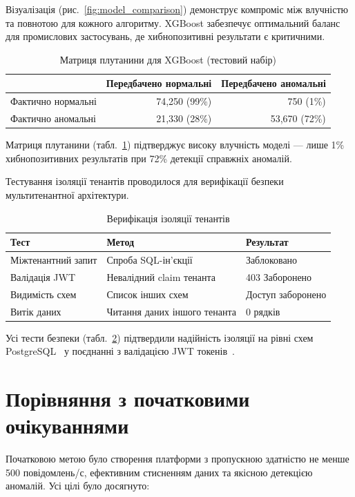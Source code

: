 Візуалізація (рис.~\ref{fig:model_comparison}) демонструє компроміс між влучністю та повнотою для кожного алгоритму. XGBoost забезпечує оптимальний баланс для промислових застосувань, де хибнопозитивні результати є критичними.

\begin{table}[h]
\caption{Матриця плутанини для XGBoost (тестовий набір)}
\label{tab:confusion_matrix}
\begin{tabular}{@{}lrr@{}}
\toprule
& Передбачено нормальні & Передбачено аномальні \\
\midrule
Фактично нормальні & 74,250 (99\%) & 750 (1\%) \\
Фактично аномальні & 21,330 (28\%) & 53,670 (72\%) \\
\bottomrule
\end{tabular}
\end{table}

Матриця плутанини (табл.~\ref{tab:confusion_matrix}) підтверджує високу влучність моделі --- лише 1\% хибнопозитивних результатів при 72\% детекції справжніх аномалій.

Тестування ізоляції тенантів проводилося для верифікації безпеки мультитенантної архітектури.

\begin{table}[h]
\caption{Верифікація ізоляції тенантів}
\label{tab:tenant_isolation}
\begin{tabular}{@{}lll@{}}
\toprule
Тест & Метод & Результат \\
\midrule
Міжтенантний запит & Спроба SQL-ін'єкції & Заблоковано \\
Валідація JWT & Невалідний claim тенанта & 403 Заборонено \\
Видимість схем & Список інших схем & Доступ заборонено \\
Витік даних & Читання даних іншого тенанта & 0 рядків \\
\bottomrule
\end{tabular}
\end{table}

Усі тести безпеки (табл.~\ref{tab:tenant_isolation}) підтвердили надійність ізоляції на рівні схем PostgreSQL~\cite{postgresql_schemas} у поєднанні з валідацією JWT токенів~\cite{jwt_rfc}.

\section{Порівняння з початковими очікуваннями}

Початковою метою було створення платформи з пропускною здатністю не менше 500 повідомлень/с, ефективним стисненням даних та якісною детекцією аномалій. Усі цілі було досягнуто:

